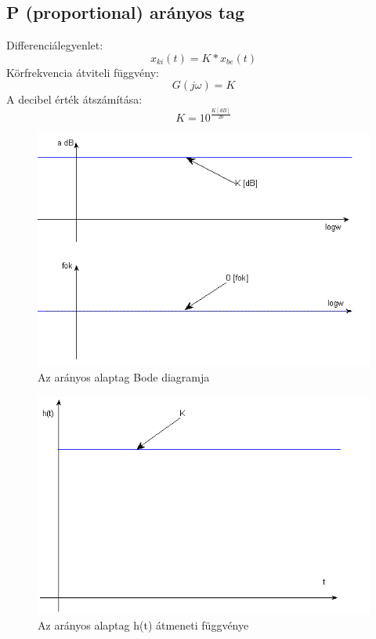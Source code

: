 \documentclass[11pt,a4paper]{article}
\begin{document}
\subsection{P (proportional) arányos tag}
Differenciálegyenlet:$$x_{ki}\left(t\right) = K * x_{be}\left(t\right)$$
Körfrekvencia átviteli függvény:$$G\left(j\omega\right) = K$$
A decibel érték átszámítása: $$K = 10^\frac{K\left[dB\right]}{20}$$
\begin{figure}[hbtp]
    	 \centering
		\includegraphics[scale=1.0]{25_p_tag_bode.png}
		\caption{Az arányos alaptag Bode diagramja}
\end{figure}
\begin{figure}[hbtp]
    	 \centering
		\includegraphics[scale=1.0]{26_p_tag_atmenet.png}
		\caption{Az arányos alaptag h(t) átmeneti függvénye}
\end{figure}
\newpage
\end{document}
